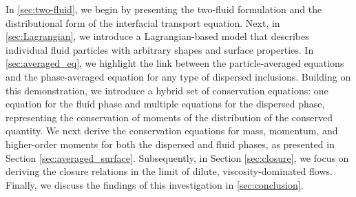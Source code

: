 
In \ref{sec:two-fluid}, we begin by presenting the two-fluid formulation and the distributional form of the interfacial transport equation. 
Next, in \ref{sec:Lagrangian}, we introduce a Lagrangian-based model that describes individual fluid particles with arbitrary shapes and surface properties. 
In \ref{sec:averaged_eq}, we highlight the link between the particle-averaged equations and the phase-averaged equation for any type of dispersed inclusions. 
Building on this demonstration, we introduce a hybrid set of conservation equations: one equation for the fluid phase and multiple equations for the dispersed phase, representing the conservation of moments of the distribution of the conserved quantity. 
We next derive the conservation equations for mass, momentum, and higher-order moments for both the dispersed and fluid phases, as presented in Section \ref{sec:averaged_surface}.
Subsequently, in Section \ref{sec:closure}, we focus on deriving the closure relations in the limit of dilute, viscosity-dominated flows.
Finally, we discuss the findings of this investigation in \ref{sec:conclusion}.


